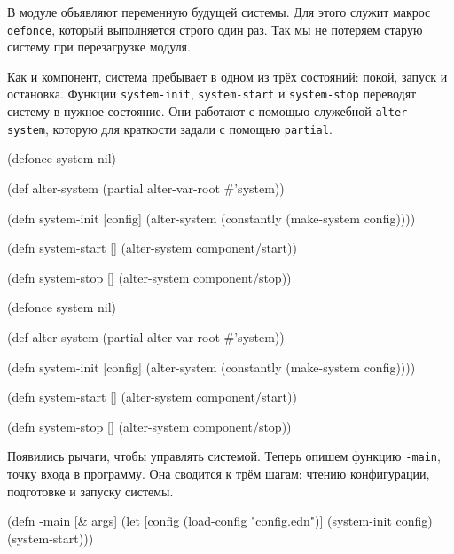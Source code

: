 В модуле объявляют переменную будущей системы. Для этого служит макрос
\verb|defonce|, который выполняется строго один раз. Так мы не потеряем старую
систему при перезагрузке модуля.

Как и компонент, система пребывает в одном из трёх состояний: покой, запуск и
остановка. Функции \verb|system-init|, \verb|system-start| и \verb|system-stop|
переводят систему в нужное состояние. Они работают с помощью служебной
\verb|alter-system|, которую для краткости задали с помощью \verb|partial|.


\ifx\DEVICETYPE\MOBILE

\begin{english}
  \begin{clojure}
(defonce system nil)

(def alter-system
  (partial alter-var-root #'system))

(defn system-init [config]
  (alter-system
    (constantly (make-system config))))

(defn system-start []
  (alter-system component/start))

(defn system-stop []
  (alter-system component/stop))
  \end{clojure}
\end{english}

\else

\begin{english}
  \begin{clojure}
(defonce system nil)

(def alter-system (partial alter-var-root #'system))

(defn system-init [config]
  (alter-system (constantly (make-system config))))

(defn system-start []
  (alter-system component/start))

(defn system-stop []
  (alter-system component/stop))
  \end{clojure}
\end{english}

\fi


Появились рычаги, чтобы управлять системой. Теперь опишем функцию \verb|-main|,
точку входа в программу. Она сводится к трём шагам: чтению конфигурации,
подготовке и запуску системы.

\ifx\DEVICETYPE\MOBILE

\begin{english}
  \begin{clojure}
(defn -main [& args]
  (let [config
        (load-config "config.edn")]
    (system-init config)
    (system-start)))
  \end{clojure}
\end{english}


